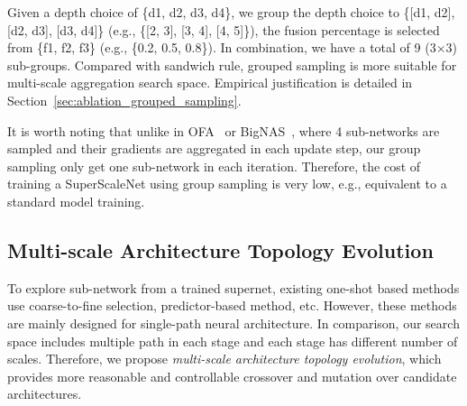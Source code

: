 \documentclass[final]{cvpr}
\newcommand{\supernet}{SuperScaleNet\xspace}
\begin{document}
Given a depth choice of \{d1, d2, d3, d4\}, we group the depth choice to \{[d1, d2], [d2, d3], [d3, d4]\} (e.g., \{[2, 3], [3, 4], [4, 5]\}), the fusion percentage is selected from \{f1, f2, f3\}  (e.g., \{0.2, 0.5, 0.8\}). In combination, we have a total of 9 (3$\times$3) sub-groups.
Compared with sandwich rule, grouped sampling is more suitable for multi-scale aggregation search space. Empirical justification is detailed in Section~\ref{sec:ablation_grouped_sampling}.


It is worth noting that unlike in OFA~\cite{cai2020once} or BigNAS~\cite{yu2020bignas}, where 4 sub-networks are sampled and their gradients are aggregated in each update step, our group sampling only get one sub-network in each iteration. Therefore, the cost of training a \supernet using group sampling is very low, e.g., equivalent to a standard model training. 

\subsection{Multi-scale Architecture Topology Evolution}
\label{sec:topology_evolution}

To explore sub-network from a trained supernet, existing one-shot based methods use coarse-to-fine selection, predictor-based method, etc. 
However, these methods are mainly designed for single-path neural architecture. 
In comparison, our search space includes multiple path in each stage and each stage has different number of scales.
Therefore, we propose \textit{multi-scale architecture topology evolution}, which provides more reasonable and controllable crossover and mutation over candidate architectures.  
\end{document}
